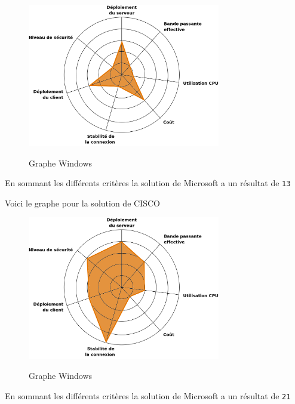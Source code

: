 \begin{figure}[H]
	\begin{center}
		\includegraphics[width=0.75\textwidth]{partie_3/images/windows.png}\\
	\end{center}
	\caption{Graphe Windows}
	\label{Graphe Windows}
\end{figure}

En sommant les différents critères la solution de Microsoft a un résultat de \verb|13|


Voici le graphe pour la solution de CISCO

\begin{figure}[H]
	\begin{center}
		\includegraphics[width=0.75\textwidth]{partie_3/images/cisco.png}\\
	\end{center}
	\caption{Graphe Windows}
	\label{Graphe Windows}
\end{figure}

En sommant les différents critères la solution de Microsoft a un résultat de \verb|21|

